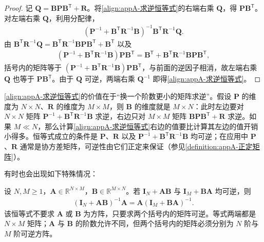 \documentclass[../main.tex]{subfiles}
\begin{document}
\begin{proof}
记 $\bm{Q}=\bm{B}\bm{P}\bm{B}^{\mathsf{T}}+\bm{R}$。将\eqref{align:appA-求逆恒等式}的右端右乘 $\bm{Q}$，得 $\bm{P}\bm{B}^{\mathsf{T}}$。对左端右乘 $\bm{Q}$，利用分配律，
\begin{align*}
 (\bm{P}^{-1}+\bm{B}^{\mathsf{T}}\bm{R}^{-1}\bm{B})^{-1}\bm{B}^{\mathsf{T}}\bm{R}^{-1}\bm{Q}.
\end{align*}
由 $\bm{B}^{\mathsf{T}}\bm{R}^{-1}\bm{Q}=\bm{B}^{\mathsf{T}}\bm{R}^{-1}\bm{B}\bm{P}\bm{B}^{\mathsf{T}}+\bm{B}^{\mathsf{T}}$ 以及
\begin{align*}
 (\bm{P}^{-1}+\bm{B}^{\mathsf{T}}\bm{R}^{-1}\bm{B})\bm{P}\bm{B}^{\mathsf{T}}=\bm{B}^{\mathsf{T}}+\bm{B}^{\mathsf{T}}\bm{R}^{-1}\bm{B}\bm{P}\bm{B}^{\mathsf{T}},
\end{align*}
括号内的矩阵等于 $(\bm{P}^{-1}+\bm{B}^{\mathsf{T}}\bm{R}^{-1}\bm{B})\bm{P}\bm{B}^{\mathsf{T}}$，与前面的逆因子相消，故左端右乘 $\bm{Q}$ 也等于 $\bm{P}\bm{B}^{\mathsf{T}}$。由于 $\bm{Q}$ 可逆，两端右乘 $\bm{Q}^{-1}$ 即得\eqref{align:appA-求逆恒等式}。
\end{proof}

\begin{remark}
\eqref{align:appA-求逆恒等式}的价值在于“换一个阶数更小的矩阵求逆”。假设 $\bm{P}$ 的维度为 $N\times N$、$\bm{R}$ 的维度为 $M\times M$，则 $\bm{B}$ 的维度就是 $M\times N$：此时左边要对 $N\times N$ 矩阵 $\bm{P}^{-1}+\bm{B}^{\mathsf{T}}\bm{R}^{-1}\bm{B}$ 求逆，右边只对 $M\times M$ 矩阵 $\bm{B}\bm{P}\bm{B}^{\mathsf{T}}+\bm{R}$ 求逆。如果 $M\ll N$，那么计算\eqref{align:appA-求逆恒等式}右边的值要比计算其左边的值开销小得多。恒等式成立的条件是 $\bm{P}$、$\bm{R}$ 以及 $\bm{P}^{-1}+\bm{B}^{\mathsf{T}}\bm{R}^{-1}\bm{B}$ 均可逆；在应用中 $\bm{P}$、$\bm{R}$ 通常是协方差矩阵，可逆性由它们正定来保证（参见\cref{definition:appA-正定矩阵}）。
\end{remark}

有时也会出现如下特殊情况：
\begin{proposition}[推入恒等式]\label{proposition:appA-推入恒等式}
设 $N,M\geqslant1$，$\bm{A}\in\mathbb{R}^{N\times M}$，$\bm{B}\in\mathbb{R}^{M\times N}$。若 $\bm{I}_{N}+\bm{A}\bm{B}$ 与 $\bm{I}_{M}+\bm{B}\bm{A}$ 均可逆，则
\begin{align}
  (\bm{I}_{N}+\bm{A}\bm{B})^{-1}\bm{A}=\bm{A}(\bm{I}_{M}+\bm{B}\bm{A})^{-1}.
  \label{align:appA-推入恒等式}
\end{align}
该恒等式不要求 $\bm{A}$ 或 $\bm{B}$ 为方阵，只要求两个括号内的矩阵可逆。等式两端都是 $N\times M$ 矩阵；$\bm{A}$ 与 $\bm{B}$ 的阶数允许不同，但两个括号内的矩阵必须分别为 $N$ 阶与 $M$ 阶可逆方阵。
\end{proposition}
\end{document}
